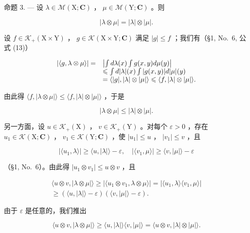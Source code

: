 命题 3. --- 设 \(\lambda \in \mathcal{M}(\mathrm{X};\mathbf{C})\) ， \(\mu \in \mathcal{M}(\mathrm{Y};\mathbf{C})\) 。则

\[
| \lambda \otimes \mu | = | \lambda | \otimes | \mu |.\tag{7}
\]

设 \(f \in \mathcal{K}_{+}(\mathrm{X} \times \mathrm{Y})\) ， \(g \in \mathcal{K}(\mathrm{X} \times \mathrm{Y}; \mathbf{C})\) 满足 \(|g| \leqslant f\) ；我们有（§1, No.~6, 公式 (13)）

\[
\begin{array}{r l} | \langle g, \lambda \otimes \mu \rangle | = & \left| \int d \lambda (x) \int g (x, y)   d \mu (y) \right| \\ & \leqslant \int d | \lambda | (x) \int | g (x, y) |   d | \mu | (y) \\ & = \langle | g |, | \lambda | \otimes | \mu | \rangle \leqslant \langle f, | \lambda | \otimes | \mu | \rangle . \end{array}
\]

由此得 \(\langle f, |\lambda \otimes \mu| \rangle \leqslant \langle f, |\lambda| \otimes |\mu| \rangle\) ，于是

\[
| \lambda \otimes \mu | \leqslant | \lambda | \otimes | \mu |.\tag{8}
\]

另一方面，设 \(u \in \mathcal{K}_{+}(\mathrm{X})\) ， \(v \in \mathcal{K}_{+}(\mathrm{Y})\) 。对每个 \(\varepsilon > 0\) ，存在 \(u_{1} \in \mathcal{K}(\mathrm{X};\mathbf{C})\) ， \(v_{1} \in \mathcal{K}(\mathrm{Y};\mathbf{C})\) ，使 \(|u_{1}| \leqslant u\) ， \(|v_{1}| \leqslant v\) ，且

\[
| \langle u _ {1}, \lambda \rangle | \geqslant \langle u, | \lambda | \rangle - \varepsilon , \quad | \langle v _ {1}, \mu \rangle | \geqslant \langle v, | \mu | \rangle - \varepsilon
\]

（§1, No.~6）。由此得 \(|u_1 \otimes v_1| \leqslant u \otimes v\) ，且

\[
\begin{array}{c} \langle u \otimes v, | \lambda \otimes \mu | \rangle \geqslant | \langle u _ {1} \otimes v _ {1}, \lambda \otimes \mu \rangle | = | \langle u _ {1}, \lambda \rangle \langle v _ {1}, \mu \rangle | \\ \geqslant (\langle u, | \lambda | \rangle - \varepsilon) (\langle v, | \mu | \rangle - \varepsilon). \end{array}
\]

由于 \(\varepsilon\) 是任意的，我们推出

\[
\langle u \otimes v, | \lambda \otimes \mu | \rangle \geqslant \langle u, | \lambda | \rangle \langle v, | \mu | \rangle = \langle u \otimes v, | \lambda | \otimes | \mu | \rangle .
\]

